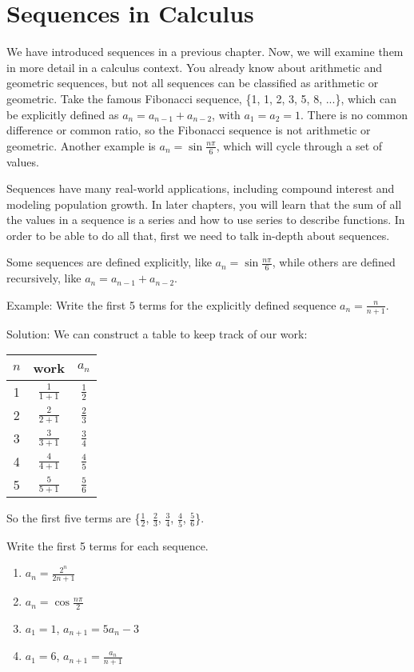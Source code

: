\chapter{Sequences in Calculus}

We have introduced sequences in a previous chapter. Now, we will examine them 
in more detail in a calculus context. You already know about arithmetic and 
geometric sequences, but not all sequences can be classified as arithmetic or 
geometric. Take the famous Fibonacci sequence, \{1, 1, 2, 3, 5, 8, ...\}, 
which can be explicitly defined as $a_n = a_{n-1} + a_{n-2}$, with $a_1 = a_2 
= 1$. There is no common difference or common ratio, so the Fibonacci sequence 
is not arithmetic or geometric. Another example is $a_n = \sin{\frac{n\pi}{6}}$, 
which will cycle through a set of values. 

Sequences have many real-world applications, including compound interest and 
modeling population growth. In later chapters, you will learn that the sum of 
all the values in a sequence is a series and how to use series to describe 
functions. In order to be able to do all that, first we need to talk in-depth 
about sequences. 

Some sequences are defined explicitly, like $a_n = \sin{\frac{n\pi}{6}}$, while 
others are defined recursively, like $a_n = a_{n-1} + a_{n-2}$. 

Example: Write the first 5 terms for the explicitly defined sequence $a_n = 
\frac{n}{n+1}$.

Solution: We can construct a table to keep track of our work:
\begin{center}
\begin{tabular}{|c|c|c|}\hline
$n$ & work & $a_n$\\
\hline
1 & $\frac{1}{1+1}$ & $\frac{1}{2}$\\
\hline
2 & $\frac{2}{2+1}$ & $\frac{2}{3}$\\
\hline
3 & $\frac{3}{3+1}$ & $\frac{3}{4}$\\
\hline
4 & $\frac{4}{4+1}$ & $\frac{4}{5}$\\
\hline
5 & $\frac{5}{5+1}$ & $\frac{5}{6}$\\
\hline
\end{tabular}
\end{center}

So the first five terms are \{$\frac{1}{2}$, $\frac{2}{3}$, $\frac{3}{4}$, 
$\frac{4}{5}$, $\frac{5}{6}$\}. 

\begin{Exercise}[label = seqcalc1]
Write the first 5 terms for each sequence. 
\begin{enumerate}
\item $a_n = \frac{2^n}{2n+1}$
\item $a_n = \cos{\frac{n\pi}{2}}$
\item $a_1 = 1$, $a_{n+1} = 5a_n-3$
\item $a_1 = 6$, $a_{n+1} = \frac{a_n}{n+1}$
\end{enumerate}
\end{Exercise}

